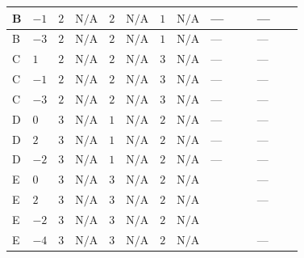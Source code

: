 \documentclass[8pt]{article}
\begin{document}
\begin{landscape}
\begin{longtable}{@{}llcccccc >{\raggedright\arraybackslash}p{0.21\linewidth} >{\raggedright\arraybackslash}p{0.21\linewidth}@{}}
\midrule
B & $-1$ & $2$ & $\text{N/A}$ & $2$ & $\text{N/A}$ & $1$ & $\text{N/A}$ & --- & --- \\
\midrule
B & $-3$ & $2$ & $\text{N/A}$ & $2$ & $\text{N/A}$ & $1$ & $\text{N/A}$ & --- & --- \\
\midrule
C & $1$ & $2$ & $\text{N/A}$ & $2$ & $\text{N/A}$ & $3$ & $\text{N/A}$ & --- & --- \\
\midrule
C & $-1$ & $2$ & $\text{N/A}$ & $2$ & $\text{N/A}$ & $3$ & $\text{N/A}$ & --- & --- \\
\midrule
C & $-3$ & $2$ & $\text{N/A}$ & $2$ & $\text{N/A}$ & $3$ & $\text{N/A}$ & --- & --- \\
\midrule
D & $0$ & $3$ & $\text{N/A}$ & $1$ & $\text{N/A}$ & $2$ & $\text{N/A}$ & --- & --- \\
\midrule
D & $2$ & $3$ & $\text{N/A}$ & $1$ & $\text{N/A}$ & $2$ & $\text{N/A}$ & --- & --- \\
\midrule
D & $-2$ & $3$ & $\text{N/A}$ & $1$ & $\text{N/A}$ & $2$ & $\text{N/A}$ & --- & --- \\
\midrule
E & $0$ & $3$ & $\text{N/A}$ & $3$ & $\text{N/A}$ & $2$ & $\text{N/A}$ & \scriptsize\adjustbox{max width=\linewidth}{$\begin{gathered} -\frac{4 {\lambda_{12}^{(\times)}}^2}{3}\end{gathered}$} & --- \\
\midrule
E & $2$ & $3$ & $\text{N/A}$ & $3$ & $\text{N/A}$ & $2$ & $\text{N/A}$ & \scriptsize\adjustbox{max width=\linewidth}{$\begin{gathered} -\frac{4 {\lambda_{12}^{(\times)}}^2}{3}\end{gathered}$} & --- \\
\midrule
E & $-2$ & $3$ & $\text{N/A}$ & $3$ & $\text{N/A}$ & $2$ & $\text{N/A}$ & \scriptsize\adjustbox{max width=\linewidth}{$\begin{gathered} -\frac{4 {\lambda_{12}^{(\times)}}^2}{3}\end{gathered}$} & \scriptsize\adjustbox{max width=\linewidth}{$\begin{gathered} -\frac{4}{3} {\lambda_{X_{7}}^{(2)}} \left({\lambda_{X_{7}}^{(2)}}\right)^{*}\end{gathered}$} \\
\midrule
E & $-4$ & $3$ & $\text{N/A}$ & $3$ & $\text{N/A}$ & $2$ & $\text{N/A}$ & \scriptsize\adjustbox{max width=\linewidth}{$\begin{gathered} -\frac{4 {\lambda_{12}^{(\times)}}^2}{3}\end{gathered}$} & --- \\
\midrule
\bottomrule
\end{longtable}
\clearpage

\end{landscape}
\end{document}
